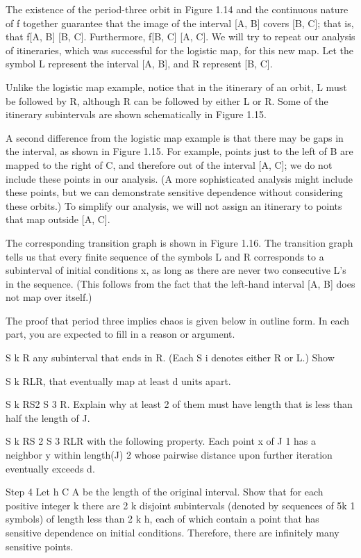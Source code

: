 \documentclass[12pt]{article}
\begin{document}
The existence of the period-three orbit in Figure 1.14 and the continuous nature of f together guarantee 
that the image of the interval [A, B] covers [B, C]; that is, that f[A, B]   [B, C]. Furthermore, f[B, C]  
[A, C]. We will try to repeat our analysis of itineraries, which was successful for the logistic map, for 
this new map. Let the symbol L represent the interval [A, B], and R represent [B, C].

Unlike the logistic map example, notice that in the itinerary of an orbit, L must be followed by R, 
although R can be followed by either L or R. Some of the itinerary subintervals are shown schematically in 
Figure 1.15.

A second difference from the logistic map example is that there may be gaps in the interval, as shown in 
Figure 1.15. For example, points just to the left of B are mapped to the right of C, and therefore out of 
the interval [A, C]; we do not include these points in our analysis. (A more sophisticated analysis might 
include these points, but we can demonstrate sensitive dependence without considering these orbits.) To 
simplify our analysis, we will not assign an itinerary to points that map outside [A, C].

The corresponding transition graph is shown in Figure 1.16. The transition graph tells us that every ﬁnite 
sequence of the symbols L and R corresponds to a subinterval of initial conditions x, as long as there are 
never two consecutive L’s in the sequence. (This follows from the fact that the left-hand interval [A, B] 
does not map over itself.)

The proof that period three implies chaos is given below in outline form. In each part, you are expected to 
ﬁll in a reason or argument.

 S k R any subinterval that ends in R. (Each S i denotes either R or L.) Show

 S k RLR, that eventually map at least d units apart.

 S k RS2  S 3 R. Explain why at least 2 of them must have length that is less than half the length of J.

 S k RS 2 S 3 RLR with the following property. Each point x of J 1 has a neighbor y within length(J)  2 
whose pairwise distance upon further iteration eventually exceeds d.

Step 4 Let h  C  A be the length of the original interval. Show that for each positive integer k there are 
2 k disjoint subintervals (denoted by sequences of 5k 1 symbols) of length less than 2 k h, each of which 
contain a point that has sensitive dependence on initial conditions. Therefore, there are inﬁnitely many 
sensitive points.
\end{document}
